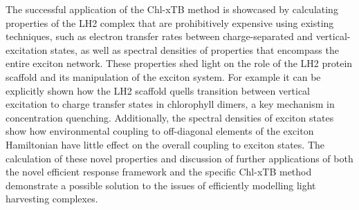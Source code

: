 \begin{SingleSpace}
The successful application of the Chl-xTB method is showcased by calculating properties 
of the LH2 complex that are prohibitively expensive using existing techniques, such 
as electron transfer rates between charge-separated and vertical-excitation states,
as well as spectral densities of properties that encompass the entire exciton network. 
These properties shed light on the role of the LH2 protein scaffold and its manipulation
of the exciton system. For example it can be explicitly shown how the LH2 scaffold 
quells transition between vertical excitation to charge transfer states in chlorophyll 
dimers, a key mechanism in concentration quenching. Additionally, the spectral densities
of exciton states show how environmental coupling to off-diagonal elements of the
exciton Hamiltonian have little effect on the overall coupling to exciton states. 
The calculation of these novel properties and discussion of further applications 
of both the novel efficient response framework and the specific Chl-xTB method demonstrate
a possible solution to the issues of efficiently modelling light harvesting complexes.

\end{SingleSpace}
\clearpage